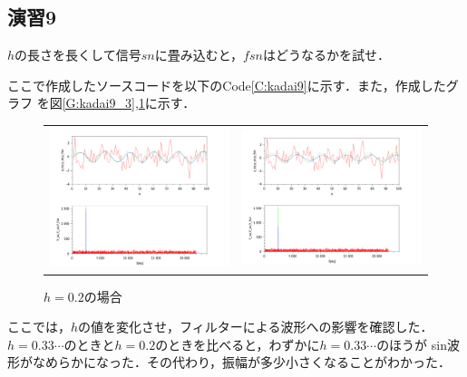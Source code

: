 \documentclass[a4paper,11pt]{jsarticle}
\begin{document}
\subsection{演習9}
\begin{screen}
  $h$の長さを長くして信号$sn$に畳み込むと，$fsn$はどうなるかを試せ．
\end{screen}
ここで作成したソースコードを以下のCode\ref{C:kadai9}に示す．また，作成したグラフ
を図\ref{G:kadai9_3},\ref{G:kadai9_5}に示す．

\begin{figure}[H]
  \begin{tabular}{cc}
    \begin{minipage}[t]{0.48\textwidth}
      \centering
      \includegraphics[clip,width=9cm]{picture/kadai9_h3.png}
      \caption{$h = 0.3333の場合$}
      \label{G:kadai9_3}
    \end{minipage} &
    \begin{minipage}[t]{0.48\textwidth}
      \centering
      \includegraphics[clip,width=9cm]{picture/kadai9_h5.png}
      \caption{$h = 0.2$の場合}
      \label{G:kadai9_5}
    \end{minipage}
  \end{tabular}
\end{figure}
ここでは，$h$の値を変化させ，フィルターによる波形への影響を確認した．$h=0.33\cdots$のときと$h=0.2$のときを比べると，わずかに$h=0.33\cdots$のほうが
sin波形がなめらかになった．その代わり，振幅が多少小さくなることがわかった．
\end{document}
